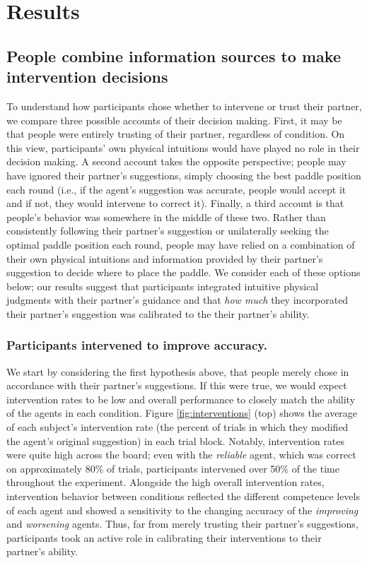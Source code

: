 \documentclass[10pt,letterpaper]{article}
\begin{document}
\section{Results}

\subsection{People combine information sources to make intervention decisions}

To understand how participants chose whether to intervene or trust their partner, we compare three possible accounts of their decision making. First, it may be that people were entirely trusting of their partner, regardless of condition. On this view, participants' own physical intuitions would have played no role in their decision making. A second account takes the opposite perspective; people may have ignored their partner's suggestions, simply choosing the best paddle position each round (i.e., if the agent's suggestion was accurate, people would accept it and if not, they would intervene to correct it). Finally, a third account is that people's behavior was somewhere in the middle of these two. Rather than consistently following their partner's suggestion or unilaterally seeking the optimal paddle position each round, people may have relied on a combination of their own physical intuitions and information provided by their partner's suggestion to decide where to place the paddle. We consider each of these options below; our results suggest that participants integrated intuitive physical judgments with their partner's guidance and that \textit{how much} they incorporated their partner's suggestion was calibrated to the their partner's ability.


\subsubsection{Participants intervened to improve accuracy.} 

We start by considering the first hypothesis above, that people merely chose in accordance with their partner's suggestions. If this were true, we would expect intervention rates to be low and overall performance to closely match the ability of the agents in each condition. Figure \ref{fig:interventions} (top) shows the average of each subject's intervention rate (the percent of trials in which they modified the agent's original suggestion) in each trial block. Notably, intervention rates were quite high across the board; even with the \textit{reliable} agent, which was correct on approximately 80\% of trials, participants intervened over 50\% of the time throughout the experiment. Alongside the high overall intervention rates, intervention behavior between conditions reflected the different competence levels of each agent and showed a sensitivity to the changing accuracy of the \textit{improving} and \textit{worsening} agents. Thus, far from merely trusting their partner's suggestions, participants took an active role in calibrating their interventions to their partner's ability.
\end{document}
